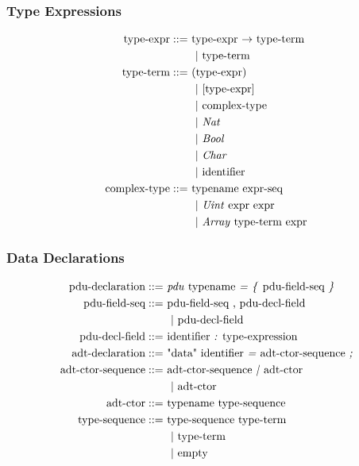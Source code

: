 \subsubsection{Type Expressions}

\begin{align*}
  \textnormal{type-expr} ::=&~
    \textnormal{type-expr $\rightarrow$ type-term}\\
    &~~|~ \textnormal{type-term}\\
  \textnormal{type-term} ::=&~
    \textnormal{(type-expr)}\\
    &~~|~ \textnormal{[type-expr]}\\
    &~~|~ \textnormal{complex-type}\\
    &~~|~ \textnormal{\emph{Nat}}\\
    &~~|~ \textnormal{\emph{Bool}}\\
    &~~|~ \textnormal{\emph{Char}}\\
    &~~|~ \textnormal{identifier}\\
  \textnormal{complex-type} ::=&~
    \textnormal{typename expr-seq} \\
    &~~|~ \textnormal{\emph{Uint} expr expr} \\
    &~~|~ \textnormal{\emph{Array} type-term expr}
\end{align*}

\subsubsection{Data Declarations}

\begin{align*}
  \textnormal{pdu-declaration} ::=&~
    \textnormal{\emph{pdu} typename \emph{=} \emph{\{} pdu-field-seq \emph{\}}}\\
  \textnormal{pdu-field-seq} ::=&~
    \textnormal{pdu-field-seq , pdu-decl-field}\\
    &~~|~ \textnormal{pdu-decl-field}\\
  \textnormal{pdu-decl-field} ::=&~
    \textnormal{identifier \emph{:} type-expression}\\
  \textnormal{adt-declaration} ::=&~
    \textnormal{"data" identifier \emph{=} adt-ctor-sequence \emph{;}}\\
  \textnormal{adt-ctor-sequence} ::=&~
    \textnormal{adt-ctor-sequence \emph{|} adt-ctor}\\
    &~~|~ \textnormal{adt-ctor}\\
  \textnormal{adt-ctor} ::=&~
    \textnormal{typename type-sequence}\\
  \textnormal{type-sequence} ::=&~
    \textnormal{type-sequence type-term}\\
    &~~|~ \textnormal{type-term}\\
    &~~|~ \textnormal{empty}
\end{align*}

